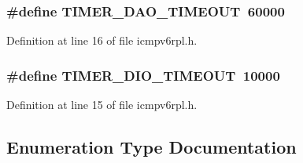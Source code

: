 \subsubsection[{\texorpdfstring{T\+I\+M\+E\+R\+\_\+\+D\+A\+O\+\_\+\+T\+I\+M\+E\+O\+UT}{TIMER_DAO_TIMEOUT}}]{\setlength{\rightskip}{0pt plus 5cm}\#define T\+I\+M\+E\+R\+\_\+\+D\+A\+O\+\_\+\+T\+I\+M\+E\+O\+UT~60000}\hypertarget{group___i_c_m_pv6_r_p_l_gae5deb3ed0de2ef56f3f87f1acf48ed13}{}\label{group___i_c_m_pv6_r_p_l_gae5deb3ed0de2ef56f3f87f1acf48ed13}


Definition at line 16 of file icmpv6rpl.\+h.

\subsubsection[{\texorpdfstring{T\+I\+M\+E\+R\+\_\+\+D\+I\+O\+\_\+\+T\+I\+M\+E\+O\+UT}{TIMER_DIO_TIMEOUT}}]{\setlength{\rightskip}{0pt plus 5cm}\#define T\+I\+M\+E\+R\+\_\+\+D\+I\+O\+\_\+\+T\+I\+M\+E\+O\+UT~10000}\hypertarget{group___i_c_m_pv6_r_p_l_ga8f668655ebf626020f3d47b5dc13cbdc}{}\label{group___i_c_m_pv6_r_p_l_ga8f668655ebf626020f3d47b5dc13cbdc}


Definition at line 15 of file icmpv6rpl.\+h.



\subsection{Enumeration Type Documentation}
